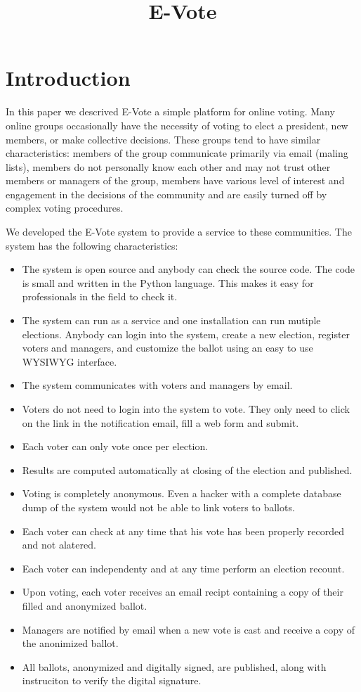 \documentclass[12pt]{article}
\title{E-Vote}
\author{}
\begin{document}
\maketitle

\section{Introduction}

In this paper we descrived E-Vote a simple platform for online voting. Many online groups occasionally have the necessity of voting to elect a president, new members, or make collective decisions. These groups tend to have similar characteristics: members of the group communicate primarily via email (maling lists), members do not personally know each other and may not trust other members or managers of the group, members have various level of interest and engagement in the decisions of the community and are easily turned off by complex voting procedures.

We developed the E-Vote system to provide a service to these communities. The system has the following characteristics:
\begin{itemize}
\item The system is open source and anybody can check the source code. The code is small and written in the Python language. This makes it easy for professionals in the field to check it.
\item The system can run as a service and one installation can run mutiple elections. Anybody can login into the system, create a new election, register voters and managers, and customize the ballot using an easy to use WYSIWYG interface.
\item The system communicates with voters and managers by email.
\item Voters do not need to login into the system to vote. They only need to click on the link in the notification email, fill a web form and submit.
\item Each voter can only vote once per election.
\item Results are computed automatically at closing of the election and published.
\item Voting is completely anonymous. Even a hacker with a complete database dump of the system would not be able to link voters to ballots.
\item Each voter can check at any time that his vote has been properly recorded and not alatered.
\item Each voter can independenty and at any time perform an election recount.
\item Upon voting, each voter receives an email recipt containing a copy of their filled and anonymized ballot.
\item Managers are notified by email when a new vote is cast and receive a copy of the anonimized ballot. 
\item All ballots, anonymized and digitally signed, are published, along with instruciton to verify the digital signature.
\end{itemize}
\end{document}
